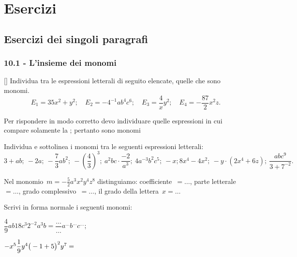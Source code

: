 \section{Esercizi}
\subsection{Esercizi dei singoli paragrafi}
\subsubsection*{10.1 - L'insieme dei monomi}
\begin{esercizio}
\label{ese:10.1}[\Ast]
Individua tra le espressioni letterali di seguito elencate, quelle che sono monomi.
\[E_{1}=35x^{2}+y^{2};\quad E_{2}=-4^{-1}ab^{4}c^{6};\quad E_{3}=\dfrac{4}{x}y^{2};\quad E_{4}=-{\frac{87}{2}}x^{2}z.\]

Per rispondere in modo corretto devo individuare quelle espressioni in
cui compare solamente la \dotfill; pertanto sono monomi \dotfill
\end{esercizio}

\begin{esercizio}
	\label{ese:10.2} %
	Individua e sottolinea i monomi tra le seguenti espressioni letterali:
	\[3+ab;\:-2a;\:-\frac{7}{3}ab^2;\:-(\frac{4}{3})^{3};\:a^{2}bc\cdot{\frac{-2}{a^{3}}};\:4a^{-3}b^{2}c^{5};\:-x; 8x^{4}-4x^{2};\:-y\cdot(2x^{4}+6z);\:\frac{abc^{9}}{3+7^{-2}}.\]
\end{esercizio}

\begin{esercizio}
	\label{ese:10.3} %
	Nel monomio~$m=-{\frac{5}{2}}a^{3}x^{2}y^{4}z^{8}$ distinguiamo: coefficiente~$=\ldots$,
	parte letterale~$=\ldots$,
	grado complessivo~$=\ldots$,
	il grado della lettera~$x=\ldots$
\end{esercizio}
\begin{esercizio}
\label{ese:10.4}
Scrivi in forma normale i seguenti monomi:
\begin{multicols}{2}
\begin{enumeratea}
 \item $\dfrac{4}{9}ab18c^{3}2^{-2}a^{3}b=\dfrac{\ldots }{\ldots }a^{\ldots}b^{\ldots }c^{\ldots }$;
 \item $-x^{5}\dfrac{1}{9}y^{4}\big(-1+5\big)^{2}y^{7}=\dotfill~$
\end{enumeratea}
\end{multicols}
\end{esercizio}


